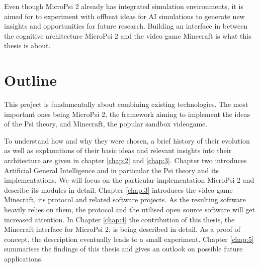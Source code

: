 Even though MicroPsi 2 already has integrated simulation environments, it is aimed for to experiment with offbeat ideas for AI simulations to generate new insights and opportunities for future research. Building an interface in between the cognitive architecture MicroPsi 2 and the video game Minecraft is what this thesis is about.

\section{Outline}
This project is fundamentally about combining existing technologies. The most important ones being MicroPsi 2, the framework aiming to implement the ideas of the Psi theory, and Minecraft, the popular sandbox videogame.

To understand how and why they were chosen, a brief history of their evolution as well as explanations of their basic ideas and relevant insights into their architecture are given in chapter \ref{chap:2} and \ref{chap:3}. Chapter two introduces Artificial General Intelligence and in particular the Psi theory and its implementations. We will focus on the particular implementation MicroPsi 2 and describe its modules in detail. Chapter \ref{chap:3} introduces the video game Minecraft, its protocol and related software projects. As the resulting software heavily relies on them, the protocol and the utilised open source software will get increased attention. 
In Chapter \ref{chap:4} the contribution of this thesis, the Minecraft interface for MicroPsi 2, is being described in detail. As a proof of concept, the description eventually leads to a small experiment.
Chapter \ref{chap:5} summarises the findings of this thesis and gives an outlook on possible future applications.